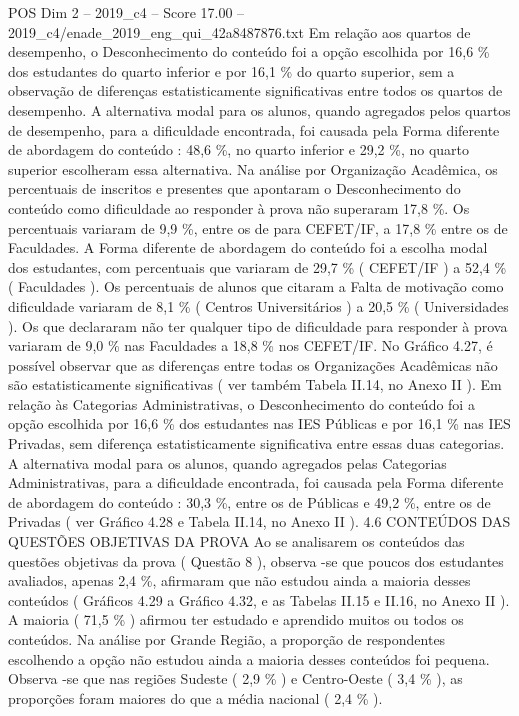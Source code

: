\begin{textsample}{POS Dim 2 – 2019\_c4 – Score 17.00 – 2019\_c4/enade\_2019\_eng\_qui\_42a8487876.txt}
Em relação aos quartos de desempenho, o Desconhecimento do conteúdo foi a opção escolhida por 16,6 \% dos estudantes do quarto inferior e por 16,1 \% do quarto superior, sem a observação de diferenças estatisticamente significativas entre todos os quartos de desempenho.
A alternativa modal para os alunos, quando agregados pelos quartos de desempenho, para a dificuldade encontrada, foi causada pela Forma diferente de abordagem do conteúdo : 48,6 \%, no quarto inferior e 29,2 \%, no quarto superior escolheram essa alternativa.
Na análise por Organização Acadêmica, os percentuais de inscritos e presentes que apontaram o Desconhecimento do conteúdo como dificuldade ao responder à prova não superaram 17,8 \%.
Os percentuais variaram de 9,9 \%, entre os de para CEFET/IF, a 17,8 \% entre os de Faculdades.
A Forma diferente de abordagem do conteúdo foi a escolha modal dos estudantes, com percentuais que variaram de 29,7 \% ( CEFET/IF ) a 52,4 \% ( Faculdades ).
Os percentuais de alunos que citaram a Falta de motivação como dificuldade variaram de 8,1 \% ( Centros Universitários ) a 20,5 \% ( Universidades ).
Os que declararam não ter qualquer tipo de dificuldade para responder à prova variaram de 9,0 \% nas Faculdades a 18,8 \% nos CEFET/IF.
No Gráfico 4.27, é possível observar que as diferenças entre todas os Organizações Acadêmicas não são estatisticamente significativas ( ver também Tabela II.14, no Anexo II ).
Em relação às Categorias Administrativas, o Desconhecimento do conteúdo foi a opção escolhida por 16,6 \% dos estudantes nas IES Públicas e por 16,1 \% nas IES Privadas, sem diferença estatisticamente significativa entre essas duas categorias.
A alternativa modal para os alunos, quando agregados pelas Categorias Administrativas, para a dificuldade encontrada, foi causada pela Forma diferente de abordagem do conteúdo : 30,3 \%, entre os de Públicas e 49,2 \%, entre os de Privadas ( ver Gráfico 4.28 e Tabela II.14, no Anexo II ). 4.6 CONTEÚDOS DAS QUESTÕES OBJETIVAS DA PROVA Ao se analisarem os conteúdos das questões objetivas da prova ( Questão 8 ), observa -se que poucos dos estudantes avaliados, apenas 2,4 \%, afirmaram que não estudou ainda a maioria desses conteúdos ( Gráficos 4.29 a Gráfico 4.32, e as Tabelas II.15 e II.16, no Anexo II ).
A maioria ( 71,5 \% ) afirmou ter estudado e aprendido muitos ou todos os conteúdos.
Na análise por Grande Região, a proporção de respondentes escolhendo a opção não estudou ainda a maioria desses conteúdos foi pequena.
Observa -se que nas regiões Sudeste ( 2,9 \% ) e Centro-Oeste ( 3,4 \% ), as proporções foram maiores do que a média nacional ( 2,4 \% ).

\end{textsample}
